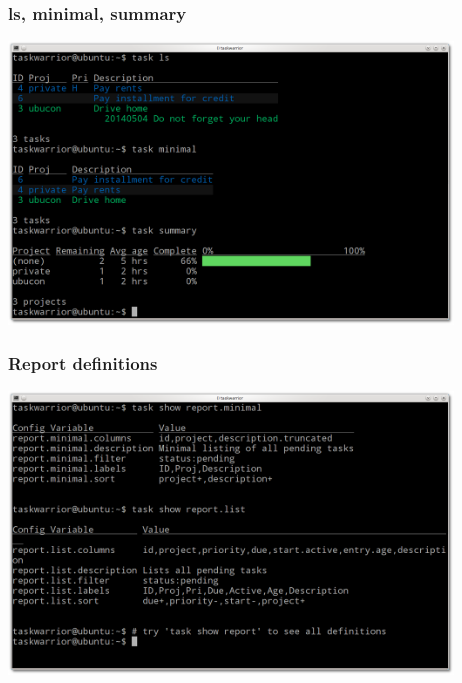 \documentclass[t,handout]{beamer}
\begin{document}
\begin{frame}[fragile]\frametitle{ls, minimal, summary}
\begin{center} %
\includegraphics[width=11.8cm,height=7.5cm]{ls-minimal-summary.png}
\end{center}
\end{frame}

\begin{frame}[fragile]\frametitle{Report definitions}
\begin{center} %
\includegraphics[width=11.8cm,height=7.5cm]{report-definitions.png}
\end{center}
\end{frame}
\end{document}
